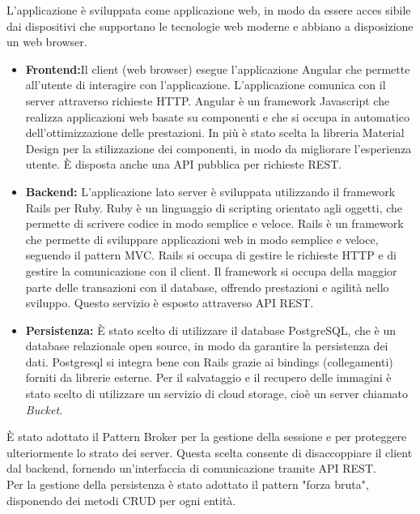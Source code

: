 L’applicazione è sviluppata come applicazione web, in modo da essere acces sibile dai dispositivi che supportano le tecnologie web moderne e abbiano a disposizione un web browser.
\begin{itemize}
	\item \large{\textbf{Frontend:}}\newline Il client (web browser) esegue l'applicazione Angular che permette all'utente di interagire con l'applicazione. L'applicazione comunica con il server attraverso richieste HTTP. Angular è un framework Javascript che realizza applicazioni web basate su componenti e che si occupa in automatico dell'ottimizzazione delle prestazioni. In più è stato scelta la libreria Material Design per la stilizzazione dei componenti, in modo da migliorare l'esperienza utente. È disposta anche una API pubblica per richieste REST. 
	\item \large{\textbf{Backend:}}\newline
	L'applicazione lato server è sviluppata utilizzando il framework Rails per Ruby. Ruby è un linguaggio di scripting orientato agli oggetti, che permette di scrivere codice in modo semplice e veloce. Rails è un framework che permette di sviluppare applicazioni web in modo semplice e veloce, seguendo il pattern MVC. Rails si occupa di gestire le richieste HTTP e di gestire la comunicazione con il client. Il framework si occupa della maggior parte delle transazioni con il database, offrendo prestazioni e agilità nello sviluppo. Questo servizio è esposto attraverso API REST.
	\item \large{\textbf{Persistenza:}}\newline
	È stato scelto di utilizzare il database PostgreSQL, che è un database relazionale open source, in modo da garantire la persistenza dei dati. Postgresql si integra bene con Rails grazie ai bindings (collegamenti) forniti da librerie esterne.
	Per il salvataggio e il recupero delle immagini è stato scelto di utilizzare un servizio di cloud storage, cioè un server chiamato \textit{Bucket}.
\end{itemize}

È stato adottato il Pattern Broker per la gestione della sessione e per proteggere ulteriormente lo strato dei server. Questa scelta consente di disaccoppiare il client dal backend, fornendo un'interfaccia di comunicazione tramite API REST.\\

Per la gestione della persistenza è stato adottato il pattern "forza bruta", disponendo dei metodi CRUD per ogni entità.\\

